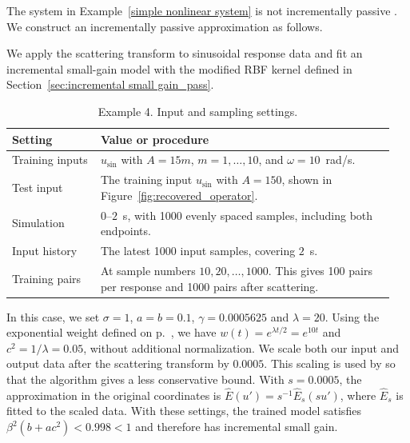 \begin{example}
The system in Example~\ref{simple nonlinear system} is not incrementally passive \autocite{Kulkarni2001}. We construct an incrementally passive approximation as follows.

\textcolor{examineredit}{We apply the scattering transform to sinusoidal response data} and fit an incremental small-gain model with the modified RBF kernel defined in Section~\ref{sec:incremental small gain_pass}.

\begin{table}[H]
    \centering
    \color{examineredit}
    \small
    \renewcommand{\arraystretch}{1.15}
    \caption{\textcolor{examineredit}{Example 4. Input and sampling settings.}}
    \label{tab:kernel-example4-settings}
    \begin{tabular}{@{}p{0.22\linewidth}p{0.73\linewidth}@{}}
        \toprule
        Setting & Value or procedure \\
        \midrule
        Training inputs & \(u_{\mathrm{sin}}\) with \(A=15m\), \(m=1,\ldots,10\), and \(\omega=10\)~rad/s. \\[4pt]
        Test input & The training input \(u_{\mathrm{sin}}\) with \(A=150\), shown in Figure~\ref{fig:recovered_operator}. \\[4pt]
        Simulation & \(0\)--\(2\)~s, with 1000 evenly spaced samples, including both endpoints. \\[4pt]
        Input history & The latest 1000 input samples, covering \(2\)~s. \\[4pt]
        Training pairs & At sample numbers \(10,20,\ldots,1000\). This gives 100 pairs per response and 1000 pairs after scattering. \\
        \bottomrule
    \end{tabular}
\end{table}


In this case, we set $\sigma=1$, $a=b=0.1$, $\gamma=0.0005625$ and \textcolor{examineredit}{$\lambda=20$}. \textcolor{examineredit}{Using the exponential weight defined on p.~\pageref{def:exponential-fading-weight}, we have \(w(t)=e^{\lambda t/2}=e^{10t}\) and \(c^2=1/\lambda=0.05\), without additional normalization.} We scale both our input and output data after the scattering transform by $0.0005$. This scaling is used by \autocite{van_waarde_kernel-based_2023} so that the algorithm gives a less conservative bound. \textcolor{examineredit}{With \(s=0.0005\), the approximation in the original coordinates is \(\widehat E(u')=s^{-1}\widehat E_s(su')\), where \(\widehat E_s\) is fitted to the scaled data.}
\textcolor{examineredit}{With these settings, the trained model satisfies \(\beta^2(b+ac^2)<0.998<1\) and therefore has incremental small gain.}


\end{example}
